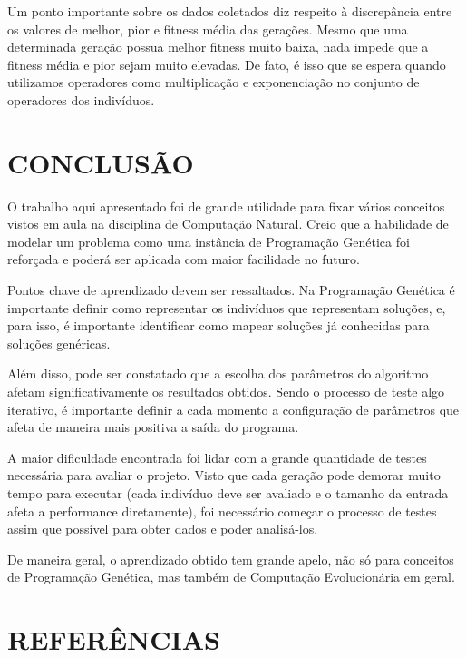 \documentclass[12pt]{article}
\begin{document}
Um ponto importante sobre os dados coletados diz respeito à discrepância entre os valores de 
melhor, pior e fitness média das gerações. Mesmo que uma determinada geração possua melhor fitness
muito baixa, nada impede que a fitness média e pior sejam muito elevadas. De fato, é isso que se
espera quando utilizamos operadores como multiplicação e exponenciação no conjunto de operadores
dos indivíduos.

\section{CONCLUSÃO}

O trabalho aqui apresentado foi de grande utilidade para fixar vários conceitos vistos em aula
na disciplina de Computação Natural. Creio que a habilidade de modelar um problema como uma
instância de Programação Genética foi reforçada e poderá ser aplicada com maior facilidade
no futuro.

Pontos chave de aprendizado devem ser ressaltados. Na Programação Genética é importante
definir como representar os indivíduos que representam soluções, e, para isso, é importante
identificar como mapear soluções já conhecidas para soluções genéricas.

Além disso, pode ser constatado que a escolha dos parâmetros do algoritmo afetam significativamente
os resultados obtidos. Sendo o processo de teste algo iterativo, é importante definir a cada
momento a configuração de parâmetros que afeta de maneira mais positiva a saída do programa.

A maior dificuldade encontrada foi lidar com a grande quantidade de testes necessária para
avaliar o projeto. Visto que cada geração pode demorar muito tempo para executar (cada indivíduo
deve ser avaliado e o tamanho da entrada afeta a performance diretamente), foi necessário começar
o processo de testes assim que possível para obter dados e poder analisá-los.

De maneira geral, o aprendizado obtido tem grande apelo, não só para conceitos de Programação Genética,
mas também de Computação Evolucionária em geral.

\section{REFERÊNCIAS}



\end{document}
